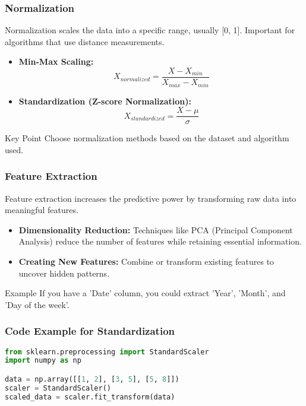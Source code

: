 \documentclass[aspectratio=169]{beamer}
\begin{document}
\begin{frame}[fragile]
  \frametitle{Normalization}

  Normalization scales the data into a specific range, usually [0, 1]. Important for algorithms that use distance measurements.

  \begin{itemize}
    \item \textbf{Min-Max Scaling:}
      \begin{equation}
      X_{normalized} = \frac{X - X_{min}}{X_{max} - X_{min}}
      \end{equation}
    \item \textbf{Standardization (Z-score Normalization):}
      \begin{equation}
      X_{standardized} = \frac{X - \mu}{\sigma}
      \end{equation}
  \end{itemize}

  \begin{block}{Key Point}
    Choose normalization methods based on the dataset and algorithm used.
  \end{block}
\end{frame}

\begin{frame}[fragile]
  \frametitle{Feature Extraction}

  Feature extraction increases the predictive power by transforming raw data into meaningful features.

  \begin{itemize}
    \item \textbf{Dimensionality Reduction:} Techniques like PCA (Principal Component Analysis) reduce the number of features while retaining essential information.
    \item \textbf{Creating New Features:} Combine or transform existing features to uncover hidden patterns.
  \end{itemize}

  \begin{block}{Example}
    If you have a 'Date' column, you could extract 'Year', 'Month', and 'Day of the week'.
  \end{block}
\end{frame}

\begin{frame}[fragile]
  \frametitle{Code Example for Standardization}

  \begin{lstlisting}[language=Python]
from sklearn.preprocessing import StandardScaler
import numpy as np

data = np.array([[1, 2], [3, 5], [5, 8]])
scaler = StandardScaler()
scaled_data = scaler.fit_transform(data)
  \end{lstlisting}
\end{frame}
\end{document}

